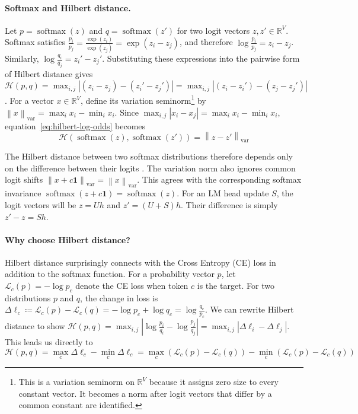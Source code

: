 \documentclass[anon]{opt2026} %
\newcommand{\R}{\mathbb{R}}
\newcommand{\one}{\mathbf{1}}
\newcommand{\abs}[1]{\left\lvert #1\right\rvert}
\newcommand{\varnorm}[1]{\left\lVert #1\right\rVert_{\mathrm{var}}}
\DeclareMathOperator{\softmax}{softmax}
\begin{document}
\paragraph{Softmax and Hilbert distance.}
\label{sec:softmax}


Let \(p=\softmax(z)\) and \(q=\softmax(z')\) for two logit vectors $z,z'\in\R^V$. Softmax satisfies \(\frac{p_i}{p_j}=\frac{\exp(z_i)}{\exp(z_j)}=\exp(z_i-z_j)\), and therefore \(\log\frac{p_i}{p_j}=z_i-z_j\). Similarly, \(\log\frac{q_i}{q_j}=z_i'-z_j'\). Substituting these expressions into the pairwise form of Hilbert distance gives \(\mathcal{H}(p,q)=\max_{i,j}\abs{(z_i-z_j)-(z_i'-z_j')}=\max_{i,j}\abs{(z_i-z_i')-(z_j-z_j')}\). For a vector $x\in\R^V$, define its variation seminorm\footnote{This is a variation seminorm on $\R^V$ because it assigns zero size to every constant vector. It becomes a norm after logit vectors that differ by a common constant are identified.} by \(\varnorm{x}=\max_i x_i-\min_i x_i\). Since \(\max_{i,j}\abs{x_i-x_j}=\max_i x_i-\min_i x_i\), equation~\ref{eq:hilbert-log-odds} becomes
\begin{equation}
\boxed{\mathcal{H}\!\left(\softmax(z),\softmax(z')\right)=\varnorm{z-z'}}
\label{eq:softmax-Hilbert}
\end{equation}

The Hilbert distance between two softmax distributions therefore depends only on the difference between their logits \citep{de1993hilbert,nielsen2023non}.
The variation norm also ignores common logit shifts \(\varnorm{x+c\one}=\varnorm{x}\). This agrees with the corresponding softmax invariance \(\softmax(z+c\one)=\softmax(z)\). For an LM head update $S$, the logit vectors will be \(z=Uh\) and \(z'=(U+S)h\). Their difference is simply \(z'-z=Sh\).

\paragraph{Why choose Hilbert distance?}

Hilbert distance surprisingly connects with the Cross Entropy (CE) loss in addition to the softmax function. For a probability vector $p$, let $\mathcal{L}_c(p) = -\log p_c$ denote the CE loss when token $c$ is the target. For two distributions $p$ and $q$, the change in loss is \(\Delta\ell_c \coloneqq \mathcal{L}_c(p) - \mathcal{L}_c(q) = -\log p_c + \log q_c = \log \frac{q_c}{p_c}\). We can rewrite Hilbert distance to show \(\mathcal{H}(p, q) = \max_{i, j} \left|\log \frac{p_i}{q_i} - \log \frac{p_j}{q_j} \right| = \max_{i, j} \left| \Delta\ell_i - \Delta\ell_j \right|\). This leads us directly to
\[
\mathcal{H}(p, q) = \max_c \Delta\ell_c - \min_c \Delta\ell_c = \max_c\left( \mathcal{L}_c(p) - \mathcal{L}_c(q) \right) - \min_c\left( \mathcal{L}_c(p) - \mathcal{L}_c(q) \right)
\]
\end{document}
